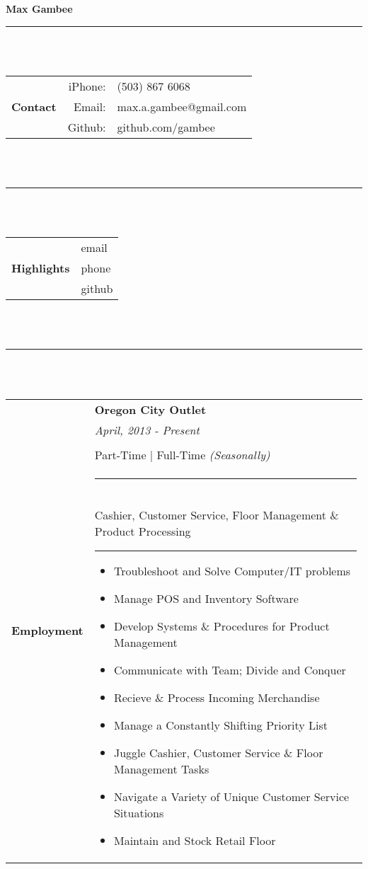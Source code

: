 \documentclass[12pt]{article}
\begin{document}
\Large\textbf{Max Gambee} \normalsize\\
\rule{5.5in}{1pt}\\\\
\begin{tabular}{r|rl}
\multirow{3}{*}{\textbf{Contact}} & iPhone: & (503) 867 6068\\
& Email: & max.a.gambee@gmail.com\\
& Github: & github.com/gambee\\
\end{tabular}
\\\\\rule{5.5in}{1pt}\\\\
\begin{tabular}{r|l}
\multirow{3}{*}{\textbf{Highlights}} & email\\
& phone\\
& github
\end{tabular}
\\\\\rule{5.5in}{1pt}\\\\
\begin{tabular}{r|l}
\multirow{5}{*}{\textbf{Employment}} &\hspace{3cm}\textbf{Oregon City Outlet}\\
& \footnotesize\hspace{0.7em}\hspace{3cm} \textit{April, 2013 - Present}\small\\\\
& \hspace{2cm}Part-Time  \hspace{0.5em}|\hspace{0.5em} Full-Time \footnotesize\textit{(Seasonally)}\\
& \parbox{\textwidth}{\footnotesize
	\rule{4.2in}{.6pt}\\
	Cashier, Customer Service, Floor Management \& Product Processing\\
	\hspace*{2em} \rule[0.5em]{3.5in}{0.1pt}
	\begin{itemize}[noitemsep, topsep=0em] \footnotesize
	\item Troubleshoot and Solve Computer/IT problems
	\item Manage POS and Inventory Software
	\item Develop Systems \& Procedures for Product Management
	\item Communicate with Team; Divide and Conquer
	\item Recieve \& Process Incoming Merchandise
	\item Manage a Constantly Shifting Priority List
	\item Juggle Cashier, Customer Service \& Floor Management Tasks
	\item Navigate a Variety of Unique Customer Service Situations
	\item Maintain and Stock Retail Floor
	\end{itemize}
	}
\end{tabular} \normalsize
\end{document}
